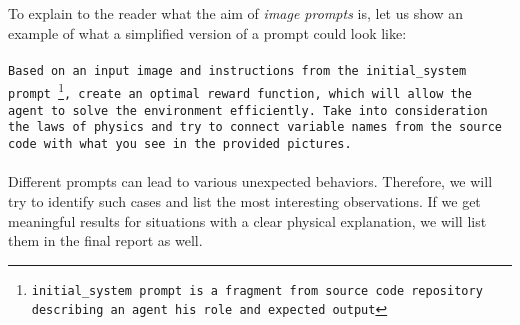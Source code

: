 \documentclass[10pt,twocolumn]{article}
\begin{document}
To explain to the reader what the aim of \textit{image prompts} is, let us show an example of what a simplified version of a prompt could look like:
\\\\
\texttt{Based on an input image and instructions from the initial\_system prompt~\footnote{initial\_system prompt is a fragment from source code repository~\cite{eureka_repo} describing an agent his role and expected output}, create an optimal reward function, which will allow the agent to solve the environment efficiently. Take into consideration the laws of physics and try to connect variable names from the source code with what you see in the provided pictures.}
\\\\
Different prompts can lead to various unexpected behaviors. Therefore, we will try to identify such cases and list the most interesting observations. If we get meaningful results for situations with a clear physical explanation, we will list them in the final report as well.
\end{document}
